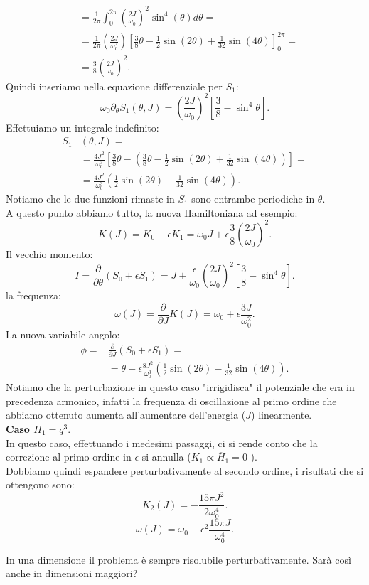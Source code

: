 \begin{exmp}
\[\begin{aligned}
	       & = \frac{1}{2\pi}\int_{0}^{2\pi} \left(\frac{2J}{\omega_0}\right)^2 \sin^4(\theta)d\theta =\\
	       & = \frac{1}{2\pi}\left(\frac{2J}{\omega_0^2}\right)\left[\frac{3}{8}\theta-\frac{1}{2}\sin(2\theta)  + \frac{1}{32}\sin (4\theta)\right]_{0}^{2\pi}=\\
	       & = \frac{3}{8}\left(\frac{2J}{\omega_0}\right)^2
    .\end{aligned}\]
    Quindi inseriamo nella equazione differenziale per $S_1$:
    \[
	\omega_0\partial_{\theta}S_1(\theta,J) = \left(\frac{2J}{\omega_0}\right)^2 \left[\frac{3}{8}-\sin^4\theta\right]
    .\] 
    Effettuiamo un integrale indefinito:
    \[\begin{aligned}
	S_1&(\theta,J)=\\
	&=\frac{4J^2}{\omega_0^3}\left[\frac{3}{8}\theta-\left(\frac{3}{8}\theta-\frac{1}{2}\sin(2\theta) +\frac{1}{32}\sin(4\theta)\right)\right]=\\
		      &= \frac{4J^2}{\omega_0^3} \left(\frac{1}{2}\sin(2\theta) -\frac{1}{32}\sin(4\theta)\right)
    .\end{aligned}\]
    Notiamo che le due funzioni rimaste in $S_1$ sono entrambe periodiche in $\theta$.\\
    A questo punto abbiamo tutto, la nuova Hamiltoniana ad esempio:
    \[
	K(J) = K_0 + \epsilon K_1 = \omega_0J + \epsilon \frac{3}{8}\left(\frac{2J}{\omega_0}\right)^2
    .\] 
    Il vecchio momento:
    \[
	I = \frac{\partial }{\partial \theta}(S_0 + \epsilon S_1)=J+\frac{\epsilon}{\omega_0}\left(\frac{2J}{\omega_0}\right)^2\left[\frac{3}{8}-\sin^4\theta\right]
    .\] 
    la frequenza:
    \[
	\omega (J)=\frac{\partial }{\partial J} K(J) = \omega_0 + \epsilon  \frac{3J}{\omega_0^2}
    .\] 
    La nuova variabile angolo:
    \[\begin{aligned}
	\phi =& \frac{\partial }{\partial J} (S_0+ \epsilon S_1) = \\
	      & = \theta + \epsilon \frac{8J^2}{\omega_0^3}\left(\frac{1}{2}\sin(2\theta) - \frac{1}{32}\sin(4\theta)\right)
    .\end{aligned}\]
    Notiamo che la perturbazione in questo caso "irrigidisca" il potenziale che era in precedenza armonico, infatti la frequenza di oscillazione al primo ordine che abbiamo ottenuto aumenta all'aumentare dell'energia ($J$) linearmente.\\
    \textbf{Caso $H_1 = q^3$}.\\
    In questo caso, effettuando i medesimi passaggi, ci si rende conto che la correzione al primo ordine in $\epsilon$ si annulla ($K_1 \propto\overline{H}_1 = 0$ ). \\
    Dobbiamo quindi espandere perturbativamente al secondo ordine, i risultati che si ottengono sono:
    \[
	K_2(J)= -\frac{15\pi J^2}{2\omega_0^4}
    .\] 
    \[
	\omega (J)=\omega_0-\epsilon^2 \frac{15\pi J}{\omega_0^4}
    .\] 
\end{exmp}
\noindent
In una dimensione il problema è sempre risolubile perturbativamente. Sarà così anche in dimensioni maggiori?
